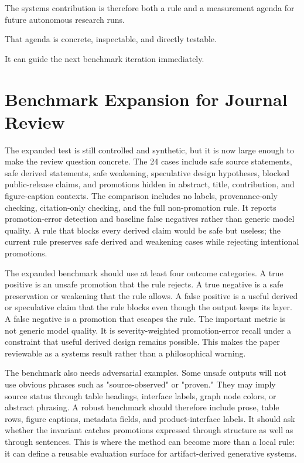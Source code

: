 \documentclass[sigconf,nonacm]{acmart}
\begin{document}
The systems contribution is therefore both a rule and a measurement agenda for
future autonomous research runs.

That agenda is concrete, inspectable, and directly testable.

It can guide the next benchmark iteration immediately.

\section{Benchmark Expansion for Journal Review}
The expanded test is still controlled and synthetic, but it is now large enough
to make the review question concrete. The 24 cases include safe source
statements, safe derived statements, safe weakening, speculative design
hypotheses, blocked public-release claims, and promotions hidden in abstract,
title, contribution, and figure-caption contexts. The comparison includes no
labels, provenance-only checking, citation-only checking, and the full
non-promotion rule. It reports promotion-error detection and baseline false
negatives rather than generic model quality. A rule that blocks every derived
claim would be safe but useless; the current rule preserves safe derived and
weakening cases while rejecting intentional promotions.

The expanded benchmark should use at least four outcome categories. A true
positive is an unsafe promotion that the rule rejects. A true negative is a
safe preservation or weakening that the rule allows. A false positive is a
useful derived or speculative claim that the rule blocks even though the output
keeps its layer. A false negative is a promotion that escapes the rule. The
important metric is not generic model quality. It is severity-weighted
promotion-error recall under a constraint that useful derived design remains
possible. This makes the paper reviewable as a systems result rather than a
philosophical warning.

The benchmark also needs adversarial examples. Some unsafe outputs will not use
obvious phrases such as "source-observed" or "proven." They may imply source
status through table headings, interface labels, graph node colors, or abstract
phrasing. A robust benchmark should therefore include prose, table rows, figure
captions, metadata fields, and product-interface labels. It should ask whether
the invariant catches promotions expressed through structure as well as through
sentences. This is where the method can become more than a local rule: it can
define a reusable evaluation surface for artifact-derived generative systems.
\end{document}
